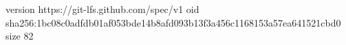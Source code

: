 version https://git-lfs.github.com/spec/v1
oid sha256:1bc08c0adfdb01af053bde14b8afd093b13f3a456c1168153a57ea641521cbd0
size 82
